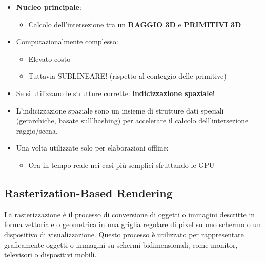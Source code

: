     \begin{itemize}
        \item \textbf{Nucleo principale}:
        \begin{itemize}
            \item Calcolo dell'intersezione tra un \textbf{RAGGIO 3D} e \textbf{PRIMITIVI 3D}
        \end{itemize}
        \item Computazionalmente complesso:
        \begin{itemize}
            \item Elevato costo
            \item Tuttavia SUBLINEARE! (rispetto al conteggio delle primitive)
        \end{itemize}
        \item Se si utilizzano le strutture corrette: \textbf{indicizzazione spaziale}!
        \item L'indicizzazione spaziale sono un insieme di strutture dati speciali (gerarchiche, basate sull'hashing) per accelerare il calcolo dell'intersezione raggio/scena.
        \item Una volta utilizzate solo per elaborazioni offline:
        \begin{itemize}
            \item Ora in tempo reale nei casi più semplici sfruttando le GPU
        \end{itemize}
    \end{itemize}
    \subsection{Rasterization-Based Rendering}
    
La rasterizzazione è il processo di conversione di oggetti o immagini descritte in forma vettoriale o geometrica in una griglia regolare di pixel su uno schermo o un dispositivo di visualizzazione. Questo processo è utilizzato per rappresentare graficamente oggetti o immagini su schermi bidimensionali, come monitor, televisori o dispositivi mobili.

